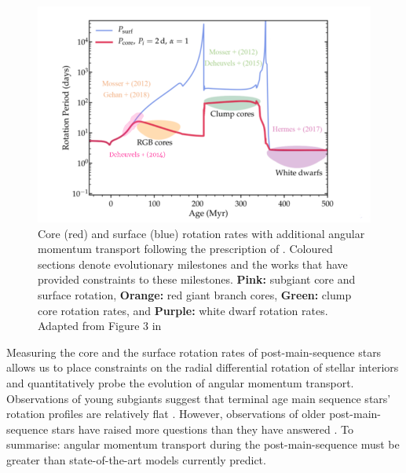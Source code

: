 \begin{figure}[h]
    \includegraphics[width=\textwidth]{Figures/intro_figures/qualitative_evo.png}
    \caption{Core (red) and surface (blue) rotation rates with additional angular momentum transport following the prescription of \citet{spada_angular_2016}. Coloured sections denote evolutionary milestones and the works that have provided constraints to these milestones. \textbf{Pink:} subgiant core and surface rotation, \textbf{Orange:} red giant branch cores, \textbf{Green:} clump core rotation rates, and \textbf{Purple:} white dwarf rotation rates. Adapted from Figure 3 in \citet{fuller_slowing_2019}}
    \label{fig:poms_evo}
\end{figure}


Measuring the core and the surface rotation rates of post-main-sequence stars allows us to place constraints on the radial differential rotation of stellar interiors and quantitatively probe the evolution of angular momentum transport.
Observations of young subgiants suggest that terminal age main sequence stars' rotation profiles are relatively flat \citep{deheuvels_seismic_2020}.
However, observations of older post-main-sequence stars have raised more questions than they have answered \citep{beck_fast_2012}.
To summarise: angular momentum transport during the post-main-sequence must be greater than state-of-the-art models currently predict.

